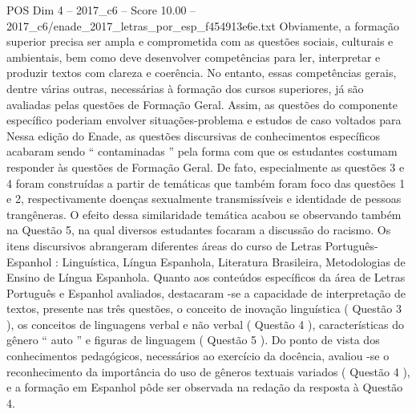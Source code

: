 \begin{textsample}{POS Dim 4 – 2017\_c6 – Score 10.00 – 2017\_c6/enade\_2017\_letras\_por\_esp\_f454913e6e.txt}
Obviamente, a formação superior precisa ser ampla e comprometida com as questões sociais, culturais e ambientais, bem como deve desenvolver competências para ler, interpretar e produzir textos com clareza e coerência.
No entanto, essas competências gerais, dentre várias outras, necessárias à formação dos cursos superiores, já são avaliadas pelas questões de Formação Geral.
Assim, as questões do componente específico poderiam envolver situações-problema e estudos de caso voltados para Nessa edição do Enade, as questões discursivas de conhecimentos específicos acabaram sendo “ contaminadas ” pela forma com que os estudantes costumam responder às questões de Formação Geral.
De fato, especialmente as questões 3 e 4 foram construídas a partir de temáticas que também foram foco das questões 1 e 2, respectivamente doenças sexualmente transmissíveis e identidade de pessoas trangêneras.
O efeito dessa similaridade temática acabou se observando também na Questão 5, na qual diversos estudantes focaram a discussão do racismo.
Os itens discursivos abrangeram diferentes áreas do curso de Letras Português-Espanhol : Linguística, Língua Espanhola, Literatura Brasileira, Metodologias de Ensino de Língua Espanhola.
Quanto aos conteúdos específicos da área de Letras Português e Espanhol avaliados, destacaram -se a capacidade de interpretação de textos, presente nas três questões, o conceito de inovação linguística ( Questão 3 ), os conceitos de linguagens verbal e não verbal ( Questão 4 ), características do gênero “ auto ” e figuras de linguagem ( Questão 5 ).
Do ponto de vista dos conhecimentos pedagógicos, necessários ao exercício da docência, avaliou -se o reconhecimento da importância do uso de gêneros textuais variados ( Questão 4 ), e a formação em Espanhol pôde ser observada na redação da resposta à Questão 4.

\end{textsample}

